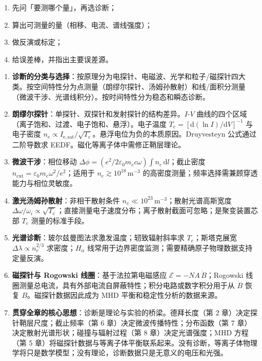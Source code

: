 \documentclass[12pt,a4paper,openany,oneside]{book}
\newcommand{\diff}{\mathrm{d}}
\newcommand{\eps}{\varepsilon}
\begin{document}
\begin{strategy}
\small
\begin{enumerate}[leftmargin=1.4em,itemsep=1pt,topsep=2pt]
\item 先问「要测哪个量」，再选诊断；
\item 算出可测量的量（相移、电流、谱线强度）；
\item 做反演或标定；
\item 给误差棒，并指出主要误差源。
\end{enumerate}
\end{strategy}

\begin{chapterreview}[title={第 12 章要点回顾：诊断——理论落地的桥梁}]
\begin{enumerate}
    \item \textbf{诊断的分类与选择}：按原理分为电探针、电磁波、光学和粒子/磁探针四大类。按空间特性分为点测量（朗缪尔探针、汤姆孙散射）和线/面积分测量（微波干涉、光谱线积分）。按时间特性分为稳态和瞬态诊断。
    
    \item \textbf{朗缪尔探针}：单探针、双探针和发射探针的结构差异。$I$-$V$ 曲线的四个区域（离子饱和、过渡、电子饱和、悬浮）。电子温度 $T_e = [\diff(\ln I)/\diff V]^{-1}$ 与电子密度 $n_e \propto I_{\mathrm{e,sat}}/\sqrt{T_e}$。悬浮电位为负的本质原因。Druyvesteyn 公式通过二阶导数求 EEDF。磁化等离子体中需修正鞘层理论。
    
    \item \textbf{微波干涉}：相位移动 $\Delta\phi = (e^2/2\eps_0 m_e c\omega) \int n_e\,\diff l$；截止密度 $n_{\mathrm{cut}} = \eps_0 m_e \omega^2/e^2$；适用于 $n_e \gtrsim 10^{18}\,\mathrm{m}^{-3}$ 的高密度测量；频率选择需兼顾穿透能力与相位灵敏度。
    
    \item \textbf{激光汤姆孙散射}：非相干散射条件 $n_e \ll 10^{23}\,\mathrm{m}^{-3}$；散射光谱高斯宽度 $\Delta\omega/\omega_i \propto \sqrt{T_e}$；直接测量电子速度分布；离子散射截面可忽略；是聚变装置芯部 $T_e$ 测量的标准手段。
    
    \item \textbf{光谱诊断}：玻尔兹曼图法求激发温度；轫致辐射斜率求 $T_e$；斯塔克展宽 $\Delta\lambda \propto n_e^{2/3}$ 求密度；$H_\alpha$ 线常用于边界密度监测；需要精确原子物理数据支持定量反演。
    
    \item \textbf{磁探针与 Rogowski 线圈}：基于法拉第电磁感应 $\mathcal{E} = -N A\,\dot{B}$；Rogowski 线圈测量总电流，具有外部电流自屏蔽特性；积分电路或数字积分用于从 $\dot{B}$ 恢复 $B$。磁探针数据因此成为 MHD 平衡和稳定性分析的数据来源。
    
    \item \textbf{贯穿全章的核心思想}：诊断是理论与实验的桥梁。德拜长度（第 2 章）决定探针鞘层尺度；截止频率（第 6 章）决定微波传播特性；分布函数（第 7 章）决定散射光谱形状；碰撞与辐射过程（第 8 章）决定光谱强度；MHD 方程（第 5 章）将磁探针数据与等离子体平衡联系起来。没有诊断，等离子体物理学将只是数学模型；没有理论，诊断数据只是无意义的电压和光强。
\end{enumerate}
\end{chapterreview}
\end{document}
